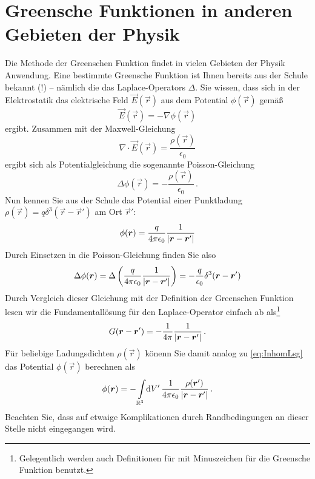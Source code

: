 \documentclass[paper=a4, fontsize=11.0pt, abstractoff, DIV12]{scrartcl}
\begin{document}
\section{Greensche Funktionen in anderen Gebieten der Physik}

Die Methode der Greenschen Funktion findet in vielen Gebieten der Physik
Anwendung. Eine bestimmte Greensche Funktion ist Ihnen bereits aus der
Schule bekannt (!) -- nämlich die das Laplace-Operators $\Delta$. Sie
wissen, dass sich in der Elektrostatik das elektrische Feld $\vec E(\vec r)$
aus dem Potential $\phi(\vec r)$ gemäß
\begin{equation}
\vec E(\vec r) = - \nabla \phi(\vec r)
\end{equation}
ergibt. Zusammen mit der Maxwell-Gleichung
\begin{equation}
\nabla\cdot\vec E(\vec r) = \frac{\rho(\vec r)}{\epsilon_0}
\end{equation}
ergibt sich als Potentialgleichung die sogenannte Poisson-Gleichung
\begin{equation}
\Delta\phi(\vec r) = -\frac{\rho(\vec r)}{\epsilon_0}\,.
\end{equation}
Nun kennen Sie aus der Schule das Potential einer Punktladung $\rho(\vec r)
= q \delta^3(\vec r - \vec r')$ am Ort $\vec r'$:
\begin{equation}
\phi({\boldsymbol{r}}) = \frac{q}{4\pi\epsilon_0}\frac{1}{\left\vert {\ensuremath{\boldsymbol{r}}} - {\boldsymbol{r}}' \right\vert}
\end{equation}
Durch Einsetzen in die Poisson-Gleichung finden Sie also
\begin{equation}
\Delta\phi({\boldsymbol{r}}) = \Delta\left(\frac{q}{4\pi\epsilon_0}\frac{1}{\left\vert {\ensuremath{\boldsymbol{r}}} - {\boldsymbol{r}}' \right\vert}\right) = -\frac{q}{\epsilon_0} \delta^3({\boldsymbol{r}} - {\boldsymbol{r}}')
\end{equation}
Durch Vergleich dieser Gleichung mit der Definition der Greenschen Funktion
lesen wir die Fundamentallösung für den Laplace-Operator einfach ab
als\footnote{Gelegentlich werden auch Definitionen für mit Minuszeichen für
die Greensche Funktion benutzt.}
\begin{equation}
G({\boldsymbol{r}} - {\boldsymbol{r}}') = -\frac{1}{4\pi}\frac{1}{\left\vert {\ensuremath{\boldsymbol{r}}} - {\boldsymbol{r}}' \right\vert}\,.
\end{equation}
Für beliebige Ladungsdichten $\rho(\vec r)$ könenn Sie damit analog zu
\eqref{eq:InhomLsg} das Potential $\phi(\vec r)$ berechnen als
\begin{equation}
\phi({\boldsymbol{r}}) = -\int\limits_{\mathbb{R}^3}\!\mathrm{d} V'\,\frac{1}{4\pi\epsilon_0}\frac{\rho({\boldsymbol{r}}')}{\left\vert {\ensuremath{\boldsymbol{r}}} - {\boldsymbol{r}}' \right\vert}\,.
\end{equation}
Beachten Sie, dass auf etwaige Komplikationen durch Randbedingungen an dieser
Stelle nicht eingegangen wird.





\end{document}
